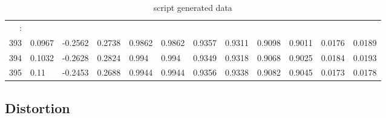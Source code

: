 \begin{table}[p]
{\begin{minipage}{\textheight}
\begin{tabular}{r|lll|ll|llll|ll}
\hline
: &         &         &        &        &        &        &        &        &        &        &        \\
393    & 0.0967  & -0.2562 & 0.2738 & 0.9862 & 0.9862 & 0.9357 & 0.9311 & 0.9098 & 0.9011 & 0.0176 & 0.0189 \\
394    & 0.1032  & -0.2628 & 0.2824 & 0.994  & 0.994  & 0.9349 & 0.9318 & 0.9068 & 0.9025 & 0.0184 & 0.0193 \\
395    & 0.11    & -0.2453 & 0.2688 & 0.9944 & 0.9944 & 0.9356 & 0.9338 & 0.9082 & 0.9045 & 0.0173 & 0.0178
\end{tabular}
       \caption{script generated data}
       \label{tab:spit-out}
     \end{minipage}
   }
 \end{table}
 
 
 
 



\subsection{Distortion}


